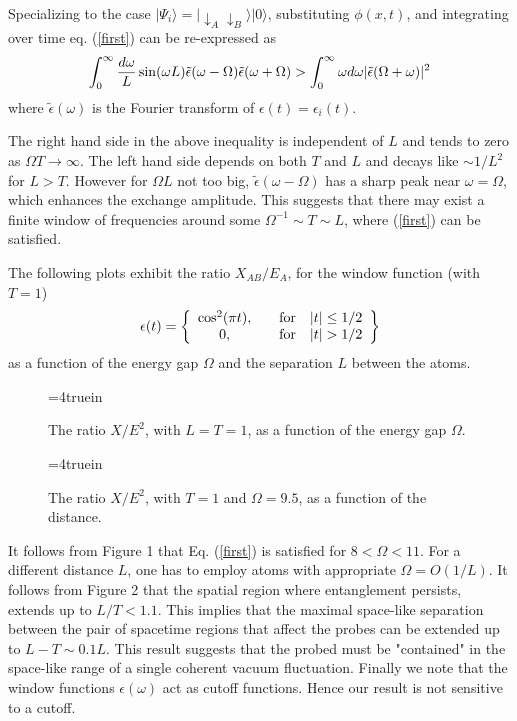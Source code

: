 \documentclass[12pt]{article}
\newcommand{\beq}{\begin{equation}}
\newcommand{\eeq}{\end{equation}}
\def \ra {\rangle}
\def \down {\downarrow}
\begin{document}
Specializing to the case $|\Psi_i\ra=|\down_A\down_B\ra|0\ra$,
substituting $\phi(x,t)$, and
integrating over time
eq. (\ref{first}) can be re-expressed as
\beq
  \int_0^\infty {d\omega\over L} \sin({\omega L}) \tilde\epsilon
(\omega-\Omega)
\tilde\epsilon(\omega+\Omega) >
\int_0^\infty \omega d\omega |\tilde\epsilon (\Omega+\omega)|^2
\eeq
where $\tilde\epsilon(\omega)$
is the Fourier transform of $\epsilon(t)=\epsilon_i(t)$.
    
The right hand side in the above inequality is independent of $L$
and tends to
zero as $\Omega T\to \infty$. The left hand side depends on both
$T$ and $L$
and decays like $\sim 1/L^2$ for $L>T$.
However for $\Omega L$ not too big,
$\tilde \epsilon(\omega-\Omega)$ has a sharp peak near
 $\omega=\Omega$, which enhances the exchange amplitude.
This suggests that there may exist a finite window of
frequencies around some $\Omega^{-1}\sim T \sim L$, where
(\ref{first})
can be satisfied.

The following plots exhibit
the ratio $X_{AB}/E_A$, for the window function (with $T=1$)
\beq
\epsilon(t) = \left\{   \begin{array}{cc} {\cos^2(\pi t)},
& \ \ \ {\rm for} \ \ \ |t| \le 1/2 \\
              0 , &  \ \ \ {\rm for} \ \ \ |t|>1/2 \end{array}
\right\}
\eeq
as a function of the energy gap $\Omega$ and the separation $L$
between the atoms.

\begin{figure}[t]
 \epsfxsize=4truein
      \centerline{}
\vspace {0.5cm}
  \caption[]{The ratio $X/E^2$,
with $L=T=1$, as a function of the energy gap $\Omega$.  }
    \label{ratio} \end{figure}

\begin{figure}[t]
\epsfxsize=4truein
      \centerline{}
\vspace {0.5cm}
  \caption[]{The ratio $X/E^2$, with $T=1$ and $\Omega=9.5$,
as a function of the distance.   }
    \label{ratiol} \end{figure}

It follows from Figure 1 that Eq. (\ref{first}) is satisfied for
 $8<\Omega <11$.
 For a different distance $L$,
one has to employ atoms with appropriate $\Omega =O(1/L)$.
It follows from Figure 2 that the spatial region where entanglement
persists,
extends up to $L/T<1.1$. This implies that the maximal
space-like separation between the pair of spacetime regions
that affect the probes  can be extended up to  $L-T \sim 0.1 L$.
This result suggests that the probed must be  "contained" in
the space-like range of a single coherent vacuum fluctuation.
Finally we note that the window functions $\epsilon(\omega)$ act
as
cutoff functions. Hence our result is not sensitive to a cutoff.
\end{document}
